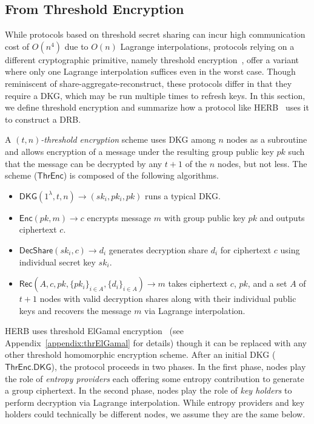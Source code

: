 \subsection{From Threshold Encryption}
While protocols based on threshold secret sharing can incur high communication cost of $O(n^4)$ due to $O(n)$ Lagrange interpolations, protocols relying on a different cryptographic primitive, namely threshold encryption~\cite{desmedt1990Threshold}, offer a variant where only one Lagrange interpolation suffices even in the worst case. Though reminiscent of share-aggregate-reconstruct, these protocols differ in that they require a DKG, which may be run multiple times to refresh keys. In this section, we define threshold encryption and summarize how a protocol like HERB~\cite{cherniaeva2019homomorphic} uses it to construct a DRB.

\begin{definition}
A \textit{$(t, n)$-threshold encryption} scheme uses DKG among $n$ nodes as a subroutine and allows encryption of a message under the resulting group public key $pk$ such that the message can be decrypted by any $t + 1$ of the $n$ nodes, but not less. The scheme ($\mathsf{ThrEnc}$) is composed of the following algorithms.
\begin{itemize}
    \item $\mathsf{DKG}(1^\lambda, t, n) \rightarrow (sk_i, pk_i, pk)$ runs a typical DKG.
    \item $\mathsf{Enc}(pk, m) \rightarrow c$ encrypts message $m$ with group public key $pk$ and outputs ciphertext $c$.
    \item $\mathsf{DecShare}(sk_i, c) \rightarrow d_i$ generates decryption share $d_i$ for ciphertext $c$ using individual secret key $sk_i$.
    \item $\mathsf{Rec}(A, c, pk, \{pk_i\}_{i \in A}, \{d_i\}_{i \in A}) \rightarrow m$ takes ciphertext $c$, $pk$, and a set $A$ of $t + 1$ nodes with valid decryption shares along with their individual public keys and recovers the message $m$ via Lagrange interpolation.
\end{itemize}
\end{definition}

HERB uses threshold ElGamal encryption~\cite{desmedt1990Threshold, fouque2001threshold} (see Appendix~\ref{appendix:thrElGamal} for details) though it can be replaced with any other threshold homomorphic encryption scheme. After an initial DKG ($\mathsf{ThrEnc.DKG}$), the protocol proceeds in two phases. In the first phase, nodes play the role of \textit{entropy providers} each offering some entropy contribution to generate a group ciphertext. In the second phase, nodes play the role of \textit{key holders} to perform decryption via Lagrange interpolation. While entropy providers and key holders could technically be different nodes, we assume they are the same below.

